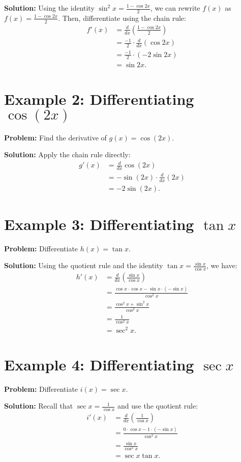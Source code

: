 \documentclass[a4paper,12pt]{book}
\begin{document}
\textbf{Solution:}
Using the identity $\sin^2 x = \frac{1 - \cos 2x}{2}$, we can rewrite $f(x)$ as $f(x) = \frac{1 - \cos 2x}{2}$. Then, differentiate using the chain rule:
\begin{align*}
f'(x) &= \frac{d}{dx} \left( \frac{1 - \cos 2x}{2} \right) \\
&= \frac{-1}{2} \cdot \frac{d}{dx} (\cos 2x) \\
&= \frac{-1}{2} \cdot (-2 \sin 2x) \\
&= \sin 2x.
\end{align*}

\section*{Example 2: Differentiating $\cos(2x)$}
\textbf{Problem:} Find the derivative of $g(x) = \cos(2x)$.

\textbf{Solution:}
Apply the chain rule directly:
\begin{align*}
g'(x) &= \frac{d}{dx} \cos(2x) \\
&= -\sin(2x) \cdot \frac{d}{dx}(2x) \\
&= -2\sin(2x).
\end{align*}

\section*{Example 3: Differentiating $\tan x$}
\textbf{Problem:} Differentiate $h(x) = \tan x$.

\textbf{Solution:}
Using the quotient rule and the identity $\tan x = \frac{\sin x}{\cos x}$, we have:
\begin{align*}
h'(x) &= \frac{d}{dx} \left( \frac{\sin x}{\cos x} \right) \\
&= \frac{\cos x \cdot \cos x - \sin x \cdot (-\sin x)}{\cos^2 x} \\
&= \frac{\cos^2 x + \sin^2 x}{\cos^2 x} \\
&= \frac{1}{\cos^2 x} \\
&= \sec^2 x.
\end{align*}

\section*{Example 4: Differentiating $\sec x$}
\textbf{Problem:} Differentiate $i(x) = \sec x$.

\textbf{Solution:}
Recall that $\sec x = \frac{1}{\cos x}$ and use the quotient rule:
\begin{align*}
i'(x) &= \frac{d}{dx} \left( \frac{1}{\cos x} \right) \\
&= \frac{0 \cdot \cos x - 1 \cdot (-\sin x)}{\cos^2 x} \\
&= \frac{\sin x}{\cos^2 x} \\
&= \sec x \tan x.
\end{align*}
\end{document}
